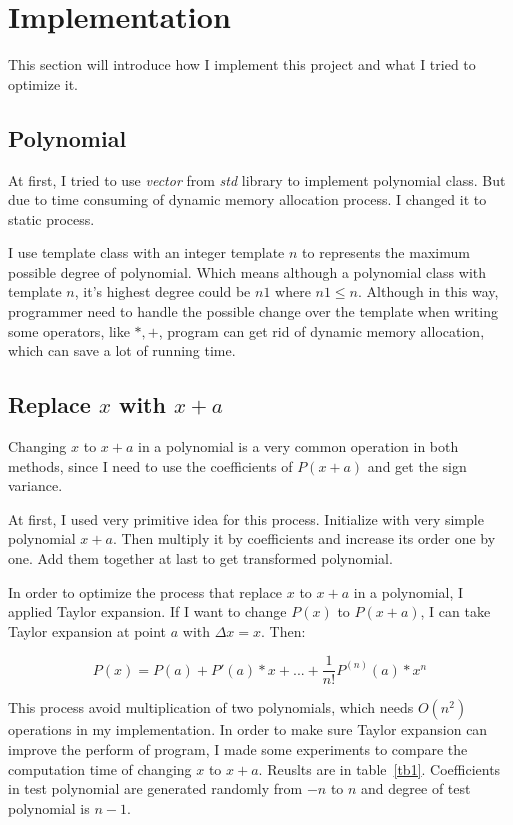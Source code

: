 \section{Implementation}

This section will introduce how I implement this project and what I tried to
optimize it.

\subsection{Polynomial} 

At first, I tried to use \textit{vector} from \textit{std} library to implement
polynomial class. But due to time consuming of dynamic memory allocation
process. I changed it to static process.  

I use template class with an integer template $n$ to represents the
maximum possible degree of polynomial. Which means although a polynomial class with
template $n$, it's highest degree could be $n1$ where $n1 \leq n$. Although in
this way, programmer need to handle the possible change over the template when
writing some operators, like $*,+$, program can get rid of dynamic memory allocation,
which can save a lot of running time.

\subsection{Replace $x$ with $x+a$}

Changing $x$ to $x+a$ in a polynomial is a very common operation in both
methods, since I need to use the coefficients of $P(x+a)$ and get the sign
variance. 

At first, I used very primitive idea for this process. Initialize with very
simple polynomial $x+ a$. Then multiply it by coefficients and increase its
order one by one. Add them together at last to get transformed polynomial.

In order to optimize the process that replace $x$ to $x+a$ in a polynomial, I applied Taylor
expansion. If I want to change $P(x)$ to $P(x+a)$, I can take Taylor expansion
at point $a$ with $\Delta x = x$. Then:

$$
P(x) = P(a) + P'(a) *x + ... + \frac{1}{n!}P^{(n)}(a)*x^n
$$

This process avoid multiplication of two polynomials, which needs $O(n^2)$
operations in my implementation. In order to make sure Taylor expansion can
improve the perform of program, I made some experiments to compare the
computation time of changing $x$ to $x+a$. Reuslts are in table~\ref{tb1}.
Coefficients in test polynomial are generated randomly from $-n$ to $n$ and
degree of test polynomial is $n-1$.

